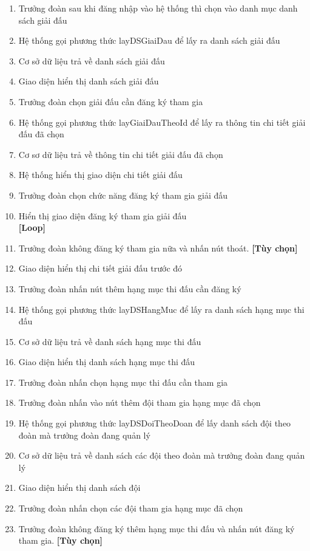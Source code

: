 \noindent
\begin{enumerate}
  \item Trưởng đoàn sau khi đăng nhập vào hệ thống thì chọn vào danh mục danh sách giải đấu
  \item Hệ thống gọi phương thức layDSGiaiDau để lấy ra danh sách giải đấu
  \item Cơ sở dữ liệu trả về danh sách giải đấu
  \item Giao diện hiển thị danh sách giải đấu
  \item Trưởng đoàn chọn giải đấu cần đăng ký tham gia
  \item Hệ thống gọi phương thức layGiaiDauTheoId để lấy ra thông tin chi tiết giải đấu đã chọn
  \item Cơ sơ dữ liệu trả về thông tin chi tiết giải đấu đã chọn
  \item Hệ thống hiển thị giao diện chi tiết giải đấu
  \item Trưởng đoàn chọn chức năng đăng ký tham gia giải đấu
  \item Hiển thị giao diện đăng ký tham gia giải đấu
        \\\textbf{[Loop]}
  \item Trưởng đoàn không đăng ký tham gia nữa và nhấn nút thoát. \textbf{[Tùy chọn]}
  \item Giao diện hiển thị chi tiết giải đấu trước đó
  \item Trưởng đoàn nhấn nút thêm hạng mục thi đấu cần đăng ký
  \item Hệ thống gọi phương thức layDSHangMuc để lấy ra danh sách hạng mục thi đấu
  \item Cơ sở dữ liệu trả về danh sách hạng mục thi đấu
  \item Giao diện hiển thị danh sách hạng mục thi đấu
  \item Trưởng đoàn nhấn chọn hạng mục thi đấu cần tham gia
  \item Trưởng đoàn nhấn vào nút thêm đội tham gia hạng mục đã chọn
  \item Hệ thống gọi phương thức layDSDoiTheoDoan để lấy danh sách đội theo đoàn mà trưởng đoàn đang quản lý
  \item Cơ sở dữ liệu trả về danh sách các đội theo đoàn mà trưởng đoàn đang quản lý
  \item Giao diện hiển thị danh sách đội
  \item Trưởng đoàn nhấn chọn các đội tham gia hạng mục đã chọn
  \item Trưởng đoàn không đăng ký thêm hạng mục thi đấu và nhấn nút đăng ký tham gia. \textbf{[Tùy chọn]}

\end{enumerate}
